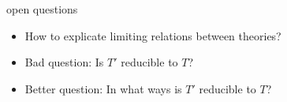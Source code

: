 \documentclass[17pt]{beamer}
\begin{document}



    









\begin{frame}{\small open questions}

  \begin{itemize}
  \item How to explicate limiting relations between theories?
  \item Bad question: Is $T'$ reducible to $T$? 
  \item Better question: In what ways is $T'$ reducible to $T$?
\end{itemize}



\end{frame}  
\end{document}
